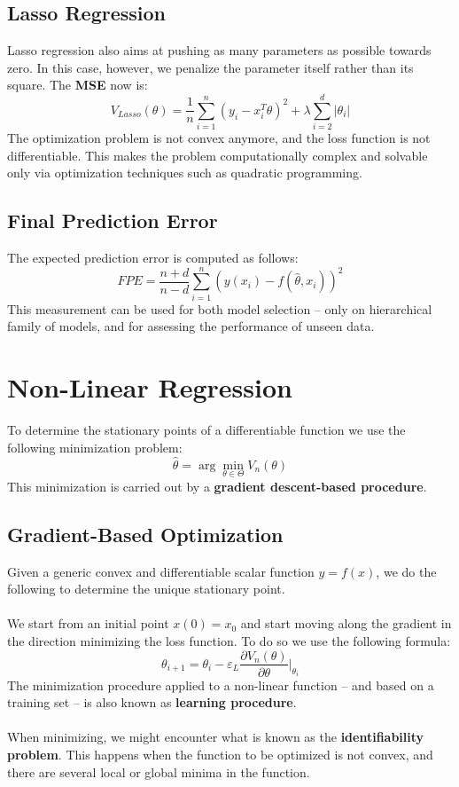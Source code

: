 \documentclass{article}
\begin{document}
\subsection{Lasso Regression}
Lasso regression also aims at pushing as many parameters as possible towards zero. In this case, however, we penalize the parameter itself rather than its square. The \textbf{MSE} now is:
\[ V_{Lasso}(\theta) = \frac{1}{n} \sum^n_{i=1}(y_i - x_i^T\theta)^2 + \lambda \sum^d_{i=2}|\theta_i| \]
The optimization problem is not convex anymore, and the loss function is not differentiable. This makes the problem computationally complex and solvable only via optimization techniques such as quadratic programming.
 
\subsection{Final Prediction Error}
The expected prediction error is computed as follows:
\[ FPE = \frac{n+d}{n-d}\sum^n_{i=1}(y(x_i) - f(\hat\theta, x_i))^2 \]
This measurement can be used for both model selection -- only on hierarchical family of models, and for assessing the performance of unseen data.
 
\section{Non-Linear Regression}
To determine the stationary points of a differentiable function we use the following minimization problem:
\[ \hat\theta = \arg \min_{\theta \in \Theta} V_n(\theta) \]
This minimization is carried out by a \textbf{gradient descent-based procedure}.
 
\subsection{Gradient-Based Optimization}
Given a generic convex and differentiable scalar function $y = f(x)$, we do the following to determine the unique stationary point. \\ \\
We start from an initial point $x(0) = x_0$ and start moving along the gradient in the direction minimizing the loss function. To do so we use the following formula:
\[ \theta_{i+1} = \theta_i - \varepsilon_L \frac{\partial V_n(\theta)}{\partial \theta}|_{\theta_i} \]
The minimization procedure applied to a non-linear function -- and based on a training set -- is also known as \textbf{learning procedure}. \\ \\
When minimizing, we might encounter what is known as the \textbf{identifiability problem}. This happens when the function to be optimized is not convex, and there are several local or global minima in the function.
\end{document}
